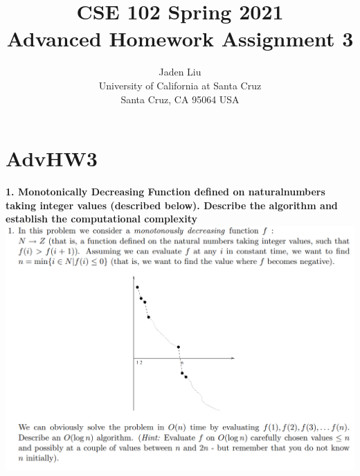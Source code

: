 \documentclass[12pt]{article}
\begin{document}
\title{ CSE 102 Spring 2021\\
	Advanced Homework Assignment 3}

\author{Jaden Liu \\ 
University of California at Santa Cruz\\
Santa Cruz, CA 95064 USA }

\maketitle


\section{AdvHW3} 

\textbf{1. Monotonically Decreasing Function defined on naturalnumbers taking integer values (described below). Describe the algorithm and establish the computational complexity}\\
\includegraphics[scale=0.35]{1.png}
\end{document}
